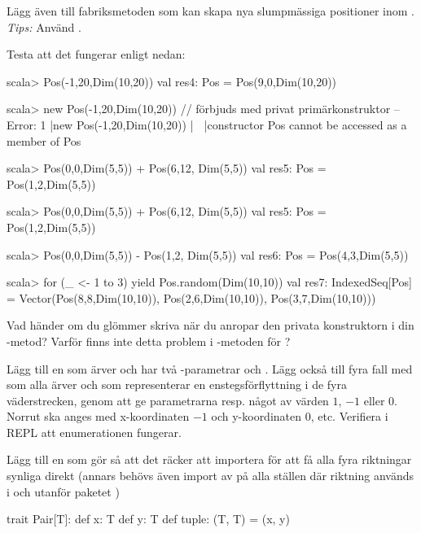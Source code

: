 Lägg även till fabriksmetoden  som kan skapa nya slumpmässiga positioner inom . \emph{Tips:} Använd .

Testa att det fungerar enligt nedan:
\begin{REPLnonum}
scala> Pos(-1,20,Dim(10,20))
val res4: Pos = Pos(9,0,Dim(10,20))

scala> new Pos(-1,20,Dim(10,20))  // förbjuds med privat primärkonstruktor
-- Error:
1 |new Pos(-1,20,Dim(10,20))
  |    ^^^
  |constructor Pos cannot be accessed as a member of Pos

scala> Pos(0,0,Dim(5,5)) + Pos(6,12, Dim(5,5))                                                                     
val res5: Pos = Pos(1,2,Dim(5,5))

scala> Pos(0,0,Dim(5,5)) + Pos(6,12, Dim(5,5))                                                                     
val res5: Pos = Pos(1,2,Dim(5,5))

scala> Pos(0,0,Dim(5,5)) - Pos(1,2, Dim(5,5))                                                                     
val res6: Pos = Pos(4,3,Dim(5,5))

scala> for (_ <- 1 to 3) yield Pos.random(Dim(10,10))
val res7: IndexedSeq[Pos] = 
  Vector(Pos(8,8,Dim(10,10)), Pos(2,6,Dim(10,10)), Pos(3,7,Dim(10,10)))
\end{REPLnonum}

\Subtask Vad händer om du glömmer skriva  när du anropar den privata konstruktorn i din -metod? Varför finns inte detta problem i -metoden för ?

\Subtask Lägg till en  som ärver  och har två -parametrar  och . Lägg också till fyra fall med  som alla ärver  och som representerar en enstegsförflyttning i de fyra väderstrecken, genom att ge parametrarna  resp.  något av värden $1$, $-1$ eller $0$. Norrut ska anges med x-koordinaten $-1$ och y-koordinaten $0$, etc. Verifiera i REPL att enumerationen fungerar.

Lägg till en  som gör så att det räcker att importera  för att få alla fyra riktningar synliga direkt (annars behövs även import av  på alla ställen där riktning används i och utanför paketet )


\SOLUTION


\TaskSolved \what

\SubtaskSolved
\begin{CodeSmall}
trait Pair[T]:
  def x: T
  def y: T
  def tuple: (T, T) = (x, y)

\end{CodeSmall}

